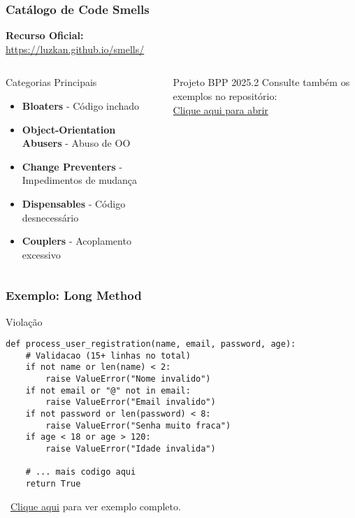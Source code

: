 \documentclass[aspectratio=169]{beamer}
\begin{document}
\begin{frame}
\frametitle{Catálogo de Code Smells}
\begin{center}
\textbf{Recurso Oficial:} \\
\vspace{0.3cm}
\Large \url{https://luzkan.github.io/smells/}
\end{center}

\vspace{0.5cm}
\begin{columns}
\begin{column}{0.5\textwidth}
\begin{block}{Categorias Principais}
\footnotesize
\begin{itemize}
    \item \textbf{Bloaters} - Código inchado
    \item \textbf{Object-Orientation Abusers} - Abuso de OO
    \item \textbf{Change Preventers} - Impedimentos de mudança
    \item \textbf{Dispensables} - Código desnecessário
    \item \textbf{Couplers} - Acoplamento excessivo
\end{itemize}
\end{block}
\end{column}

\begin{column}{0.5\textwidth}
\begin{alertblock}{Projeto BPP 2025.2}
\footnotesize
Consulte também os exemplos no repositório: \\
\vspace{0.2cm}
\href{https://github.com/fmarquesfilho/bpp-2025-2}{Clique aqui para abrir}
\end{alertblock}
\end{column}
\end{columns}
\end{frame}

\begin{frame}[fragile]
\frametitle{Exemplo: Long Method}
\begin{block}{\textcolor{cleanred}{\faTimes} Violação}
\tiny
\begin{lstlisting}
def process_user_registration(name, email, password, age):
    # Validacao (15+ linhas no total)
    if not name or len(name) < 2:
        raise ValueError("Nome invalido")
    if not email or "@" not in email:
        raise ValueError("Email invalido") 
    if not password or len(password) < 8:
        raise ValueError("Senha muito fraca")
    if age < 18 or age > 120:
        raise ValueError("Idade invalida")

    # ... mais codigo aqui
    return True
\end{lstlisting}
\end{block}

\vspace{0.1cm}
\footnotesize
\faGithub \, \href{https://github.com/fmarquesfilho/bpp-2025-2/}{Clique aqui} para ver exemplo completo.
\end{frame}
\end{document}
